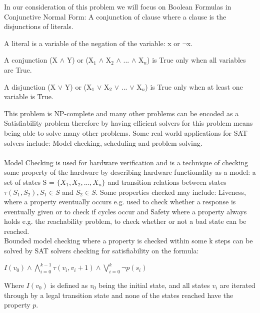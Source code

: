 \documentclass[12pt,a4paper]{article}
\begin{document}
In our consideration of this problem we will focus on Boolean Formulas in Conjunctive Normal Form: A conjunction of clause where a clause is the disjunctions of literals. 
\begin{itemize}
	\begin{item}
	A literal is a variable of the negation of the variable: x or $\neg$x.
	\end{item}
	\begin{item}
	A conjunction (X $\land$ Y) or (X$_1$ $\land$ X$_2$ $\land$ ... $ \land$ X$_n$) is True only when all variables are True.
	\end{item}
	\begin{item}
	A disjunction (X $\lor$ Y) or (X$_1$ $\lor$ X$_2$ $\lor$ ... $\lor$ X$_n$) is True only when at least one variable is True.
	\end{item}
\end{itemize}
This problem is NP-complete and many other problems can be encoded as a Satisfiability problem therefore by having efficient solvers for this problem means being able to solve many other problems. Some real world applications for SAT solvers include: Model checking, scheduling and problem solving.\\\\
Model Checking \cite[p. 2027]{ModelChecking} is used for hardware verification and is a technique of checking some property of the hardware by describing hardware functionality as a model: a set of states S  = $\{X_1, X_2, ..., X_n\}$ and transition relations between states  $\tau(S_1, S_2), S_1\in S$ and $S_2 \in S$. Some properties checked may include: Liveness, where a property eventually occurs e.g. used to check whether a response is eventually given or to check if cycles occur and Safety where a property always holds e.g. the reachability problem, to check whether or not a bad state can be reached. \\
Bounded model checking \cite[p. 2029]{ModelChecking} where a property is checked within some k steps can be solved by SAT solvers checking for satisfiability on the formula: \\
\begin{center}
$I(v_0) \land \bigwedge \limits_{i=0}^{k-1} \tau(v_i, v_i+1) \land \bigvee \limits_{i=0}^{k}\neg p(s_i)$ 
\end{center}
Where $I(v_0)$ is defined as $v_0$ being the initial state, and all states $v_i$ are iterated through by a legal transition state and none of the states reached have the property $p$.\\\\ 
\end{document}
